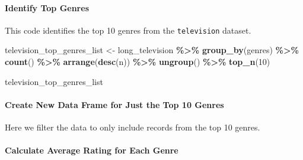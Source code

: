 \documentclass[
]{book}
\newenvironment{Shaded}{\begin{snugshade}}{\end{snugshade}}
\newcommand{\DecValTok}[1]{\textcolor[rgb]{0.00,0.00,0.81}{#1}}
\newcommand{\FunctionTok}[1]{\textcolor[rgb]{0.13,0.29,0.53}{\textbf{#1}}}
\newcommand{\NormalTok}[1]{#1}
\newcommand{\OtherTok}[1]{\textcolor[rgb]{0.56,0.35,0.01}{#1}}
\newcommand{\SpecialCharTok}[1]{\textcolor[rgb]{0.81,0.36,0.00}{\textbf{#1}}}
\begin{document}
\paragraph*{Identify Top Genres}\label{identify-top-genres}

This code identifies the top 10 genres from the \texttt{television} dataset.

\begin{Shaded}
\begin{Highlighting}[]
\NormalTok{television\_top\_genres\_list }\OtherTok{\textless{}{-}}\NormalTok{ long\_television }\SpecialCharTok{\%\textgreater{}\%}
  \FunctionTok{group\_by}\NormalTok{(genres) }\SpecialCharTok{\%\textgreater{}\%}
  \FunctionTok{count}\NormalTok{() }\SpecialCharTok{\%\textgreater{}\%}
  \FunctionTok{arrange}\NormalTok{(}\FunctionTok{desc}\NormalTok{(n)) }\SpecialCharTok{\%\textgreater{}\%}
  \FunctionTok{ungroup}\NormalTok{() }\SpecialCharTok{\%\textgreater{}\%}
  \FunctionTok{top\_n}\NormalTok{(}\DecValTok{10}\NormalTok{)}

\NormalTok{television\_top\_genres\_list}
\end{Highlighting}
\end{Shaded}

\paragraph*{Create New Data Frame for Just the Top 10 Genres}\label{create-new-data-frame-for-just-the-top-10-genres}

Here we filter the data to only include records from the top 10 genres.

\begin{Shaded}
\end{Shaded}

\paragraph*{Calculate Average Rating for Each Genre}\label{calculate-average-rating-for-each-genre}
\end{document}
